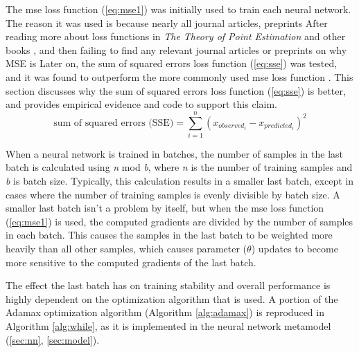 The \gls{mse} loss function (\ref{eq:mse1}) was initially used to train each neural network.
The reason it was used is because nearly all journal articles, preprints
After reading more about loss functions in \textit{The Theory of Point Estimation} \cite{lehmann} and other books \cite{bertsekas,devore,kuhn}, and then failing to find any relevant journal articles or preprints on why MSE is  
Later on, the sum of squared errors loss function (\ref{eq:sse}) was tested, and it was found to outperform the more commonly used \gls{mse} loss function \cite{chollet,goodfellow}.
This section discusses why the sum of squared errors loss function (\ref{eq:sse}) is better, and provides empirical evidence and code to support this claim.
%
\begin{equation}
  \label{eq:sse}
  \mbox{sum of squared errors (SSE)} = \sum_{i = 1}^{n} (x_{observed_{i}} - x_{predicted_{i}})^{2}
\end{equation}

\noindent When a neural network is trained in batches, the number of samples in the last batch is calculated using \textit{n} mod \textit{b}, where \textit{n} is the number of training samples and \textit{b} is batch size.
Typically, this calculation results in a smaller last batch, except in cases where the number of training samples is evenly divisible by batch size.
A smaller last batch isn't a problem by itself, but when the \gls{mse} loss function (\ref{eq:mse1}) is used, the computed gradients are divided by the number of samples in each batch.
This causes the samples in the last batch to be weighted more heavily than all other samples, which causes parameter ($\theta$) updates to become more sensitive to the computed gradients of the last batch.

The effect the last batch has on training stability and overall performance is highly dependent on the optimization algorithm that is used.
A portion of the Adamax optimization algorithm (Algorithm \ref{alg:adamax}) is reproduced in Algorithm \ref{alg:while}, as it is implemented in the neural network metamodel (\ref{sec:nn}, \ref{sec:model}).

